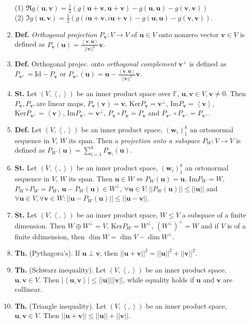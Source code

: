 \documentclass{article}
\newcommand{\<}{\left<}
\renewcommand{\>}{\right>}
\newcommand{\im}{\text{Im}}
\renewcommand{\ker}{\text{Ker}}
\newcommand{\Id}{\text{Id}}
\newcommand*\norm[1]{||#1||}
\newcommand{\F}{\mathbb{F}}
\newcommand{\define}{\textbf{Def. }}
\newcommand{\state}{\textbf{St. }}
\newcommand{\theor}{\textbf{Th. }}
\begin{document}
\begin{multicols}{3}
\begin{enumerate}[itemsep=2pt, topsep=2pt, partopsep=2pt, parsep=2pt]
        (1) $\Re g(\bm u,\bm v)=\frac{1}{2}\left(g(\bm u+\bm v,\bm u+\bm v)-g(\bm u,\bm u)-g(\bm v,\bm v)\right)$\\ (2) $\Im g(\bm u, \bm v)=\frac{1}{2}\left(g(i\bm u+\bm v,i\bm u+\bm v)-g(\bm u,\bm u)-g(\bm v,\bm v)\right)$.
        \item \define \emph{Orthogonal projection} $P_{\bm v}:V\to V$ of $\bm u\in V$ onto nonzero vector $\bm v\in V$ is defined as $P_{\bm v}(\bm u)=\frac{\<\bm v,\bm u\>}{\norm{\bm v}^2}\bm v$.
        \item \define Orthogonal projec. onto \emph{orthogonal complement} $\bm v^\perp$ is defined as $P_{\bm v^\perp}=\Id-P_{\bm v}$ or $P_{\bm v^\perp}(\bm u)=\bm u-\frac{\<\bm v,\bm u\>}{\norm{\bm v}^2}\bm v$.
        \item \state Let $(V,\<,\>)$ be an inner product space over $\F$, $\bm u,\bm v\in V,\bm v\neq 0$. Then $P_{\bm v},P_{\bm v^\perp}$are linear maps, $P_{\bm v}(\bm v)=\bm v$, $\ker P_{\bm v}=\bm v^\perp$, $\im P_{\bm v}=\<\bm v\>$, $\ker P_{\bm v^\perp}=\<\bm v\>$, $\im P_{\bm v^\perp}=\bm v^\perp$, $P_{\bm v}\circ P_{\bm v}=P_{\bm v}$ and $P_{\bm v^\perp}\circ P_{\bm v^\perp}=P_{\bm v^\perp}$.
        \item \define Let $(V,\<,\>)$ be an inner product space, $(\bm w_i)_1^k$ an ortonormal sequence in $V$, $W$ its span. Then a \emph{projection onto a subspace} $P_W:V\to V$ is defined as $P_W(\bm u)=\sum_{i=1}^kP_{\bm w_i}(\bm u)$.
        \item \state Let $(V,\<,\>)$ be an inner product space, $(\bm w_i)_1^k$ an ortonormal sequence in $V$, $W$ its span. Then $\bm u\in W\Longleftrightarrow P_W(\bm u)=\bm u$, $\im P_W=W$, $P_W\circ P_W=P_W$, $\bm u-P_W(\bm u)\in W^\perp$, $\forall\bm u\in V:\norm{P_W(\bm u)}\leq\norm{\bm u}$ and $\forall\bm u\in V,\forall\bm v\in W:\norm{\bm u-P_W(\bm u)}\leq\norm{\bm u-\bm v}$.
        \item \state Let $(V,\<,\>)$ be an inner product space, $W\leq V$ a subspace of a finite dimension. Then $W\oplus W^\perp=V$, $\ker P_W=W^\perp$, $\left(W^\perp\right)^\perp=W$ and if $V$ is of a finite ddimension, then $\dim W=\dim V-\dim W^\perp$.
        \item \theor (Pythagora's). If $\bm u\perp\bm v$, then $\norm{\bm u+\bm v}^2=\norm{\bm u}^2+\norm{\bm v}^2$.
        \item \theor (Schwarz inequality). Let $(V,\<,\>)$ be an inner product space, $\bm u,\bm v\in V$. Then $|\<\bm u,\bm v\>|\leq\norm{\bm u}\norm{\bm v}$, while equality holds if $\bm u$ and $\bm v$ are collinear.
        \item \theor (Triangle inequality). Let $(V,\<,\>)$ be an inner product space, $\bm u,\bm v\in V$. Then $\norm{\bm u+\bm v}\leq\norm{\bm u}+\norm{\bm v}$.


\end{enumerate}
\end{multicols}
\end{document}
